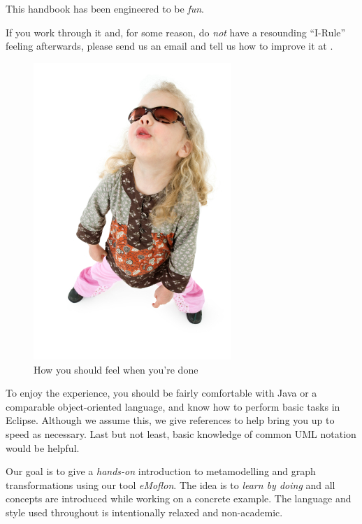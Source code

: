 \genHeader
\part{\partTitle}
\label{chap:introduction}


This handbook has been engineered to be \emph{fun}.

If you work through it and, for some reason, do \emph{not} have a resounding \mbox{\enquote{I-Rule}} feeling afterwards, please send us an email and tell us how to improve it at \eMoflonContact.

\begin{figure}[htp]
\begin{center}
	\includegraphics[height=0.45\textheight]{../introduction_images/i-rule}
	\caption{How you should feel when you're done}
	\label{i-rule}
\end{center}
\end{figure}
\break
 

To enjoy the experience, you should be fairly comfortable with Java or a comparable object-oriented language, and know how to perform basic tasks in Eclipse. 
Although we assume this, we give references to help bring you up to speed as necessary.
Last but not least, basic knowledge of common UML notation would be helpful.

Our goal is to give a \emph{hands-on} introduction to metamodelling and graph transformations using our tool \emph{eMoflon}.
The idea is to \emph{learn by doing} and all concepts are introduced while working on a concrete example.
The language and style used throughout is intentionally relaxed and non-academic.



